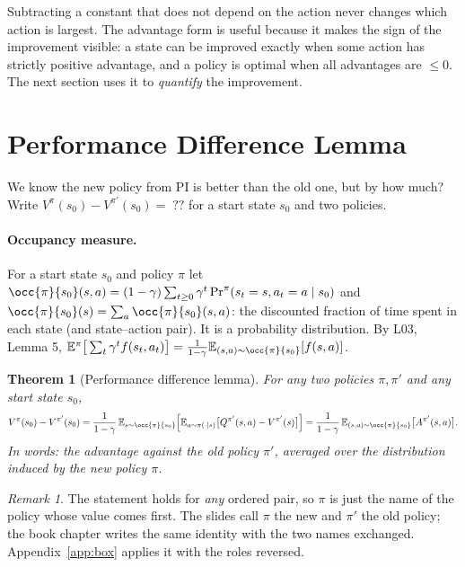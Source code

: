 \documentclass[11pt,a4paper]{article}
\newcommand{\E}{\mathbb{E}}
\theoremstyle{plain}
\newtheorem{theorem}{Theorem}[section]
\theoremstyle{definition}
\theoremstyle{remark}
\newtheorem*{remark}{Remark}
\begin{document}
\begin{intuition}
Subtracting a constant that does not depend on the action never changes which action is largest. The advantage form is useful because it makes the sign of the improvement visible: a state can be improved exactly when some action has strictly positive advantage, and a policy is optimal when all advantages are $\le0$. The next section uses it to \emph{quantify} the improvement.
\end{intuition}

\section{Performance Difference Lemma}\label{sec:pdl}
We know the new policy from PI is better than the old one, but by how much? Write $V^\pi(s_0)-V^{\pi'}(s_0)=\;??$ for a start state $s_0$ and two policies.

\paragraph{Occupancy measure.} For a start state $s_0$ and policy $\pi$ let $\occ{\pi}{s_0}(s,a)=(1-\gamma)\sum_{t\ge0}\gamma^t\Pr^\pi(s_t=s,a_t=a\mid s_0)$ and $\occ{\pi}{s_0}(s)=\sum_a\occ{\pi}{s_0}(s,a)$: the discounted fraction of time spent in each state (and state--action pair). It is a probability distribution. By L03, Lemma 5, $\E^\pi\big[\sum_t\gamma^tf(s_t,a_t)\big]=\frac1{1-\gamma}\E_{(s,a)\sim\occ{\pi}{s_0}}[f(s,a)]$.

\begin{theorem}[Performance difference lemma]\label{thm:pdl}
For any two policies $\pi,\pi'$ and any start state $s_0$,
\[
V^{\pi}(s_0)-V^{\pi'}(s_0)=\frac{1}{1-\gamma}\,\E_{s\sim\occ{\pi}{s_0}}\Big[\E_{a\sim\pi(\cdot|s)}\big[Q^{\pi'}(s,a)-V^{\pi'}(s)\big]\Big]=\frac{1}{1-\gamma}\,\E_{(s,a)\sim\occ{\pi}{s_0}}\big[A^{\pi'}(s,a)\big].
\]
In words: the advantage against the \emph{old} policy $\pi'$, averaged over the distribution induced by the \emph{new} policy $\pi$.
\end{theorem}

\begin{remark}
The statement holds for \emph{any} ordered pair, so $\pi$ is just the name of the policy whose value comes first. The slides call $\pi$ the new and $\pi'$ the old policy; the book chapter writes the same identity with the two names exchanged. Appendix~\ref{app:box} applies it with the roles reversed.
\end{remark}
\end{document}
